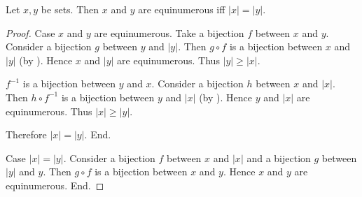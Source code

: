 \documentclass[10pt]{article}
\begin{document}
  \begin{forthel}
    \begin{proposition}
      Let $x, y$ be sets.
      Then $x$ and $y$ are equinumerous iff $|x| = |y|$.
    \end{proposition}
    \begin{proof}
      Case $x$ and $y$ are equinumerous.
        Take a bijection $f$ between $x$ and $y$.
        Consider a bijection $g$ between $y$ and $|y|$.
        Then $g \circ f$ is a bijection between $x$ and $|y|$ (by ).
        Hence $x$ and $|y|$ are equinumerous.
        Thus $|y| \geq |x|$.

        $f^{-1}$ is a bijection between $y$ and $x$.
        Consider a bijection $h$ between $x$ and $|x|$.
        Then $h \circ f^{-1}$ is a bijection between $y$ and $|x|$ (by ).
        Hence $y$ and $|x|$ are equinumerous.
        Thus $|x| \geq |y|$.

        Therefore $|x| = |y|$.
      End.

      Case $|x| = |y|$.
        Consider a bijection $f$ between $x$ and $|x|$ and a bijection $g$
        between $|y|$ and $y$.
        Then $g \circ f$ is a bijection between $x$ and $y$.
        Hence $x$ and $y$ are equinumerous.
      End.
    \end{proof}
  \end{forthel}
\end{document}
